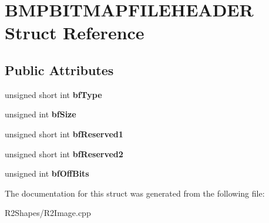 \hypertarget{struct_b_m_p_b_i_t_m_a_p_f_i_l_e_h_e_a_d_e_r}{}\section{B\+M\+P\+B\+I\+T\+M\+A\+P\+F\+I\+L\+E\+H\+E\+A\+D\+ER Struct Reference}
\label{struct_b_m_p_b_i_t_m_a_p_f_i_l_e_h_e_a_d_e_r}
\subsection*{Public Attributes}
\begin{DoxyCompactItemize}
\item 
unsigned short int {\bfseries bf\+Type}\hypertarget{struct_b_m_p_b_i_t_m_a_p_f_i_l_e_h_e_a_d_e_r_a6bb3b793bc2a761b47f031a71a3a3c11}{}\label{struct_b_m_p_b_i_t_m_a_p_f_i_l_e_h_e_a_d_e_r_a6bb3b793bc2a761b47f031a71a3a3c11}

\item 
unsigned int {\bfseries bf\+Size}\hypertarget{struct_b_m_p_b_i_t_m_a_p_f_i_l_e_h_e_a_d_e_r_a9c8b0788052021669999c6d9d7c1a94e}{}\label{struct_b_m_p_b_i_t_m_a_p_f_i_l_e_h_e_a_d_e_r_a9c8b0788052021669999c6d9d7c1a94e}

\item 
unsigned short int {\bfseries bf\+Reserved1}\hypertarget{struct_b_m_p_b_i_t_m_a_p_f_i_l_e_h_e_a_d_e_r_a3db9b3d9d399cebb1a621de0d677681d}{}\label{struct_b_m_p_b_i_t_m_a_p_f_i_l_e_h_e_a_d_e_r_a3db9b3d9d399cebb1a621de0d677681d}

\item 
unsigned short int {\bfseries bf\+Reserved2}\hypertarget{struct_b_m_p_b_i_t_m_a_p_f_i_l_e_h_e_a_d_e_r_a1b086e51744606dfbfba6bb611c3f398}{}\label{struct_b_m_p_b_i_t_m_a_p_f_i_l_e_h_e_a_d_e_r_a1b086e51744606dfbfba6bb611c3f398}

\item 
unsigned int {\bfseries bf\+Off\+Bits}\hypertarget{struct_b_m_p_b_i_t_m_a_p_f_i_l_e_h_e_a_d_e_r_a73ee348ab90a2ae5093688eb24236115}{}\label{struct_b_m_p_b_i_t_m_a_p_f_i_l_e_h_e_a_d_e_r_a73ee348ab90a2ae5093688eb24236115}

\end{DoxyCompactItemize}


The documentation for this struct was generated from the following file\+:\begin{DoxyCompactItemize}
\item 
R2\+Shapes/R2\+Image.\+cpp\end{DoxyCompactItemize}
